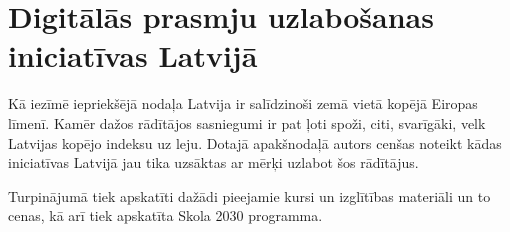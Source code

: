 \section{Digitālās prasmju uzlabošanas iniciatīvas Latvijā}
Kā iezīmē iepriekšējā nodaļa Latvija ir salīdzinoši zemā vietā kopējā Eiropas līmenī.
Kamēr dažos rādītājos sasniegumi ir pat ļoti spoži, citi, svarīgāki, velk Latvijas kopējo
indeksu uz leju. Dotajā apakšnodaļā autors cenšas noteikt kādas iniciatīvas Latvijā jau
tika uzsāktas ar mērķi uzlabot šos rādītājus.
\par
Turpinājumā tiek apskatīti dažādi pieejamie kursi un izglītības materiāli un to cenas,
kā arī tiek apskatīta Skola 2030 programma.
